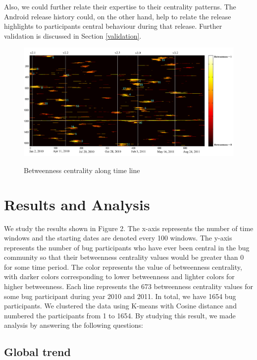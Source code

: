 \documentclass[10pt, conference, compsocconf]{IEEEtran}
\begin{document}
Also, we could further relate their expertise to their centrality
patterns. The Android release history could, on the other hand, help
to relate the release highlights to participants central behaviour during
that release. Further validation is discussed in Section
\ref{validation}. 


\begin{figure}[ht]
\centering
\includegraphics[width=18cm]{result.pdf}
\label{result}
\caption{Betweenness centrality along time line}
\end{figure}

\section{Results and Analysis}
\label{results}

We study the results shown in Figure 2. The x-axis represents the
number of time windows and the starting dates are denoted every 100
windows. The y-axis represents the number of bug participants who have
ever been central in the bug community so that their betweenness
centrality values would be greater than 0 for some time period. The
color represents the value of betweenness centrality, with darker
colors corresponding to lower betweenness and lighter colors for
higher betweenness. Each line represents the 673 betweenness
centrality values for some bug participant during year 2010 and
2011. In total, we have 1654 bug participants. We clustered the data
using K-means with Cosine distance and numbered the participants from
1 to 1654. By studying this result, we made analysis by answering the
following questions:


\subsection{Global trend}
\end{document}
